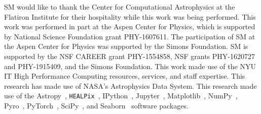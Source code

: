 \documentclass[]{article}
\begin{document}
\begin{ack}
SM would like to thank the Center for Computational Astrophysics at the Flatiron Institute for their hospitality while this work was being performed. 
This work was performed in part at the Aspen Center for Physics, which is supported by National Science Foundation grant PHY-1607611.
The participation of SM at the Aspen Center for Physics was supported by the Simons Foundation.
SM is supported by the NSF CAREER grant PHY-1554858, NSF grants PHY-1620727 and PHY-1915409, and the Simons Foundation. 
This work made use of the NYU IT High Performance Computing resources, services, and staff expertise. 
This research has made use of NASA's Astrophysics Data System. 
This research made use of the Astropy~\cite{Robitaille:2013mpa,Price-Whelan:2018hus},
\texttt{HEALPix}~\cite{Gorski:2004by,Zonca2019},
IPython~\cite{PER-GRA:2007},
Jupyter~\cite{Kluyver2016JupyterN},
Matplotlib~\cite{Hunter:2007},
NumPy~\cite{harris_array_2020},
Pyro~\cite{bingham2019pyro},
PyTorch~\cite{NEURIPS2019_9015},
SciPy~\cite{2020SciPy-NMeth}, and
Seaborn~\cite{michael_waskom_2017_883859}
software packages.
\end{ack}



\end{document}
